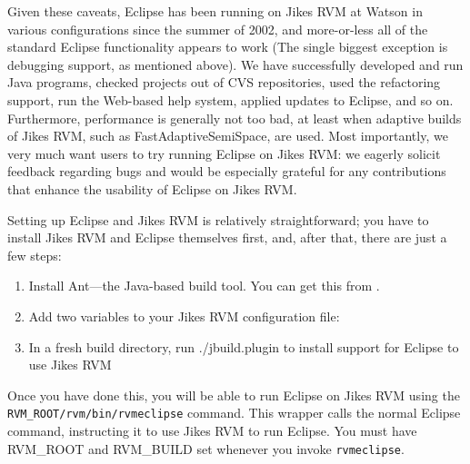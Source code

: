 Given these caveats, Eclipse has been running on Jikes RVM at
Watson in various configurations since the summer of 2002, and
more-or-less all of the standard Eclipse functionality appears to work
(The single biggest exception is debugging support, as mentioned
above).  We have successfully developed and run Java programs, checked
projects out of CVS repositories, used the refactoring support, run
the Web-based help system, applied updates to Eclipse, and so on.
Furthermore, performance is generally not too bad, at least when
adaptive builds of Jikes RVM, such as FastAdaptiveSemiSpace, 
are used.  Most importantly, we very much
want users to try running Eclipse on Jikes RVM: we eagerly
solicit feedback regarding bugs and would be especially grateful for
any contributions that enhance the usability of Eclipse on Jikes RVM.  

Setting up Eclipse and Jikes RVM is relatively straightforward; you
have to install Jikes RVM and Eclipse themselves first, and, after
that, there are just a few steps:
\begin{enumerate}
\item Install Ant---the Java-based build tool.  You can get this from
\xlink{{\tt \antURL}}{\antURL}. 
\item Add two variables to your Jikes RVM configuration file:
\item In a fresh build directory, run ./jbuild.plugin to install
support for Eclipse to use Jikes RVM
\end{enumerate}

 Once you have done this, you will be able to run Eclipse on Jikes RVM
using the {\tt RVM\_ROOT/rvm/bin/rvmeclipse} command.  This wrapper
calls the normal Eclipse command, instructing it to use Jikes RVM to
run Eclipse.  You must have RVM\_ROOT and RVM\_BUILD set whenever you
invoke {\tt rvmeclipse}.
